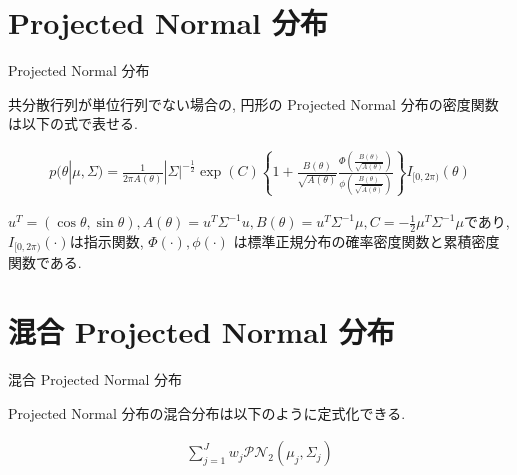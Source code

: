 \documentclass[dvipdfmx]{beamer}
\begin{document}
\section{Projected Normal 分布}
\begin{frame}{Projected Normal 分布}

共分散行列が単位行列でない場合の, 円形の Projected Normal 分布の密度関数は以下の式で表せる. \cite{PN1}

\begin{eqnarray*}
\label{PNC}
p(\theta|\mu, \Sigma) = \frac{1}{2\pi A(\theta)}|\Sigma|^{-\frac{1}{2}}
\exp(C)\left\{1 + \frac{B(\theta)}{\sqrt{A(\theta)}} \frac{\Phi \left(\frac{B(\theta)}{\sqrt{A(\theta)}}\right)}{\phi \left(\frac{B(\theta)}{\sqrt{A(\theta)}}\right)}\right\} I_{[0,2\pi)}(\theta)
\end{eqnarray*}

$u^T = (\cos\theta,\sin\theta), A(\theta) = u^T\Sigma^{-1}u, B(\theta) = u^T \Sigma^{-1} \mu, C = -\frac{1}{2} \mu^T \Sigma^{-1} \mu$であり, $I_{[0,2\pi)} (\cdot)$は指示関数, $\Phi(\cdot),\phi(\cdot)$ は標準正規分布の確率密度関数と累積密度関数である.

\end{frame}

\section{混合 Projected Normal 分布}
\begin{frame}{混合 Projected Normal 分布}

Projected Normal 分布の混合分布は以下のように定式化できる. 

\begin{eqnarray*}
\sum^J_{j=1} w_j \mathcal{PN}_2(\mu_j, \Sigma_j)
\end{eqnarray*}
\end{frame}
\end{document}
